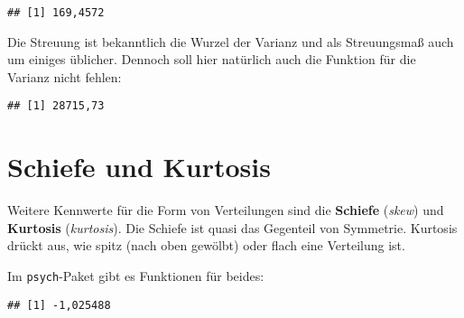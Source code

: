 \documentclass[
]{book}
\newenvironment{Shaded}{\begin{snugshade}}{\end{snugshade}}
\newcommand{\AttributeTok}[1]{\textcolor[rgb]{0.77,0.63,0.00}{#1}}
\newcommand{\ConstantTok}[1]{\textcolor[rgb]{0.00,0.00,0.00}{#1}}
\newcommand{\FunctionTok}[1]{\textcolor[rgb]{0.00,0.00,0.00}{#1}}
\newcommand{\NormalTok}[1]{#1}
\newcommand{\SpecialCharTok}[1]{\textcolor[rgb]{0.00,0.00,0.00}{#1}}
\begin{document}
\begin{Shaded}
\end{Shaded}

\begin{verbatim}
## [1] 169,4572
\end{verbatim}

Die Streuung ist bekanntlich die Wurzel der Varianz und als Streuungsmaß auch um einiges üblicher. Dennoch soll hier natürlich auch die Funktion für die Varianz nicht fehlen:

\begin{Shaded}
\end{Shaded}

\begin{verbatim}
## [1] 28715,73
\end{verbatim}

\hypertarget{schiefe-und-kurtosis}{%
\section{Schiefe und Kurtosis}\label{schiefe-und-kurtosis}}

Weitere Kennwerte für die Form von Verteilungen sind die \textbf{Schiefe} (\emph{skew}) und \textbf{Kurtosis} (\emph{kurtosis}). Die Schiefe ist quasi das Gegenteil von Symmetrie. Kurtosis drückt aus, wie spitz (nach oben gewölbt) oder flach eine Verteilung ist.

Im \texttt{psych}-Paket gibt es Funktionen für beides:

\begin{Shaded}
\end{Shaded}

\begin{verbatim}
## [1] -1,025488
\end{verbatim}
\end{document}
